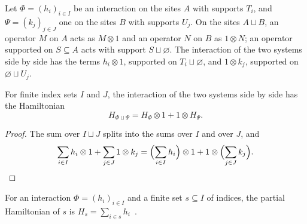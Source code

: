 \begin{definition}
    \label{def:dynamics_interaction_sum}
    \leanok
    Let $\Phi=(h_i)_{i\in I}$ be an interaction on the sites $A$ with supports
    $T_i$, and $\Psi=(k_j)_{j\in J}$ one on the sites $B$ with supports $U_j$.
    On the sites $A\sqcup B$, an operator $M$ on $A$ acts as $M\otimes1$ and an
    operator $N$ on $B$ as $1\otimes N$; an operator supported on $S\subseteq A$
    acts with support $S\sqcup\varnothing$. The interaction of the two systems side
    by side has the terms $h_i\otimes1$, supported on $T_i\sqcup\varnothing$, and
    $1\otimes k_j$, supported on $\varnothing\sqcup U_j$.
\end{definition}

\begin{theorem}
    \label{thm:dynamics_interaction_sum_hamiltonian}
    \leanok
    For finite index sets $I$ and $J$, the interaction of the two systems side by
    side has the Hamiltonian
    \[
        H_{\Phi\sqcup\Psi}=H_\Phi\otimes1+1\otimes H_\Psi .
    \]
\end{theorem}
\begin{proof}
    \leanok
    The sum over $I\sqcup J$ splits into the sums over $I$ and over $J$, and
    \[
        \sum_{i\in I}h_i\otimes1+\sum_{j\in J}1\otimes k_j
        =\Bigl(\sum_{i\in I}h_i\Bigr)\otimes1+1\otimes\Bigl(\sum_{j\in J}k_j\Bigr).
    \]
\end{proof}

\begin{definition}
    \label{def:dynamics_partial_hamiltonian}
    \leanok
    For an interaction $\Phi=(h_i)_{i\in I}$ and a finite set $s\subseteq I$ of indices,
    the partial Hamiltonian of $s$ is $H_s=\sum_{i\in s}h_i$~\cite{Hastings2007AreaLaw}.
\end{definition}

